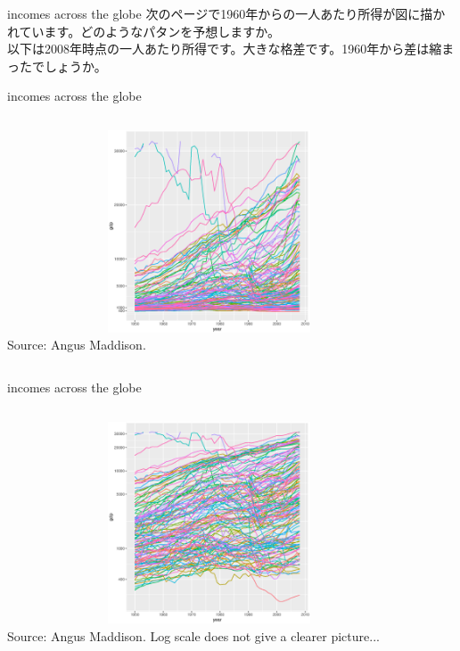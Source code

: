 \begin{frame}{incomes across the globe}
次のページで1960年からの一人あたり所得が図に描かれています。どのようなパタンを予想しますか。\\
以下は2008年時点の一人あたり所得です。大きな格差です。1960年から差は縮まったでしょうか。\\
\hfil
\end{frame}
\begin{frame}{incomes across the globe}
\begin{columns}[T]
\includegraphics[clip, width = 12cm, height = 6cm]{1/world_income_1950-2008_natural.eps}\\
Source: Angus Maddison.
\end{columns}
\end{frame}
\begin{frame}{incomes across the globe}
\begin{columns}[T]
\hfil\includegraphics[clip, width = 12cm, height = 6cm]{1/world_income_1950-2008.eps}\\
Source: Angus Maddison.
Log scale does not give a clearer picture...
\end{columns}
\end{frame}








